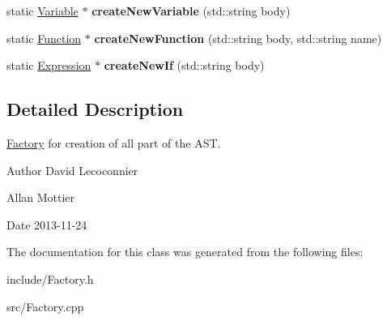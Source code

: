 \begin{DoxyCompactItemize}
\item 
\hypertarget{class_factory_aa8d2f485f3d0149e21379db73fdb3f3e}{static \hyperlink{class_variable}{Variable} $\ast$ {\bfseries create\-New\-Variable} (std\-::string body)}\label{class_factory_aa8d2f485f3d0149e21379db73fdb3f3e}

\item 
\hypertarget{class_factory_a6e3efbf0b46a2dd377a090df884e3d3a}{static \hyperlink{class_function}{Function} $\ast$ {\bfseries create\-New\-Function} (std\-::string body, std\-::string name)}\label{class_factory_a6e3efbf0b46a2dd377a090df884e3d3a}

\item 
\hypertarget{class_factory_a8c4f24af9a5df62838dacce174242111}{static \hyperlink{class_expression}{Expression} $\ast$ {\bfseries create\-New\-If} (std\-::string body)}\label{class_factory_a8c4f24af9a5df62838dacce174242111}

\end{DoxyCompactItemize}


\subsection{Detailed Description}
\hyperlink{class_factory}{Factory} for creation of all part of the A\-S\-T. 

\begin{DoxyAuthor}{Author}
David Lecoconnier 

Allan Mottier 
\end{DoxyAuthor}
\begin{DoxyDate}{Date}
2013-\/11-\/24 
\end{DoxyDate}


The documentation for this class was generated from the following files\-:\begin{DoxyCompactItemize}
\item 
include/Factory.\-h\item 
src/Factory.\-cpp\end{DoxyCompactItemize}
